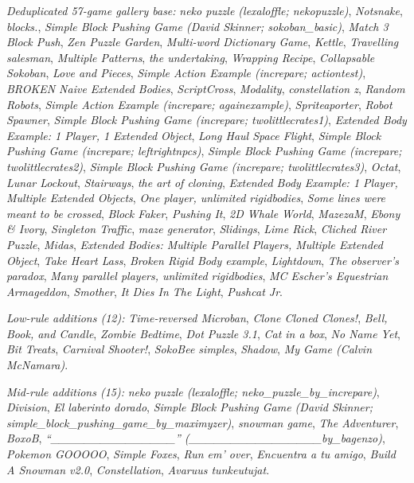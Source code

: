 \textit{Deduplicated 57-game gallery base:}
{\small
\textit{neko puzzle (lexaloffle; nekopuzzle)}, \textit{Notsnake},
\textit{blocks.}, \textit{Simple Block Pushing Game (David Skinner;
sokoban\_basic)}, \textit{Match 3 Block Push}, \textit{Zen Puzzle
Garden}, \textit{Multi-word Dictionary Game}, \textit{Kettle},
\textit{Travelling salesman}, \textit{Multiple Patterns}, \textit{the
undertaking}, \textit{Wrapping Recipe}, \textit{Collapsable Sokoban},
\textit{Love and Pieces}, \textit{Simple Action Example (increpare;
actiontest)}, \textit{BROKEN Naive Extended Bodies},
\textit{ScriptCross}, \textit{Modality}, \textit{constellation z},
\textit{Random Robots}, \textit{Simple Action Example (increpare;
againexample)}, \textit{Spriteaporter}, \textit{Robot Spawner},
\textit{Simple Block Pushing Game (increpare; twolittlecrates1)},
\textit{Extended Body Example: 1 Player, 1 Extended Object},
\textit{Long Haul Space Flight}, \textit{Simple Block Pushing Game
(increpare; leftrightnpcs)}, \textit{Simple Block Pushing Game
(increpare; twolittlecrates2)}, \textit{Simple Block Pushing Game
(increpare; twolittlecrates3)}, \textit{Octat}, \textit{Lunar
Lockout}, \textit{Stairways}, \textit{the art of cloning},
\textit{Extended Body Example: 1 Player, Multiple Extended Objects},
\textit{One player, unlimited rigidbodies}, \textit{Some lines were
meant to be crossed}, \textit{Block Faker}, \textit{Pushing It},
\textit{2D Whale World}, \textit{MazezaM}, \textit{Ebony \& Ivory},
\textit{Singleton Traffic}, \textit{maze generator},
\textit{Slidings}, \textit{Lime Rick}, \textit{Cliched River Puzzle},
\textit{Midas}, \textit{Extended Bodies: Multiple Parallel Players,
Multiple Extended Object}, \textit{Take Heart Lass}, \textit{Broken
Rigid Body example}, \textit{Lightdown}, \textit{The observer's
paradox}, \textit{Many parallel players, unlimited rigidbodies},
\textit{MC Escher's Equestrian Armageddon}, \textit{Smother},
\textit{It Dies In The Light}, \textit{Pushcat Jr}.
}

\textit{Low-rule additions (12):}
{\small
\textit{Time-reversed Microban}, \textit{Clone Cloned Clones!},
\textit{Bell, Book, and Candle}, \textit{Zombie Bedtime},
\textit{Dot Puzzle 3.1}, \textit{Cat in a box}, \textit{No Name Yet},
\textit{Bit Treats}, \textit{Carnival Shooter!}, \textit{SokoBee
simples}, \textit{Shadow}, \textit{My Game (Calvin McNamara)}.
}

\textit{Mid-rule additions (15):}
{\small
\textit{neko puzzle (lexaloffle; neko\_puzzle\_by\_increpare)},
\textit{Division}, \textit{El laberinto dorado}, \textit{Simple
Block Pushing Game (David Skinner;
simple\_block\_pushing\_game\_by\_maximyzer)}, \textit{snowman game},
\textit{The Adventurer}, \textit{BoxoB},
\textit{``\_\_\_\_\_\_\_\_\_\_\_\_\_\_\_'' (\_\_\_\_\_\_\_\_\_\_\_\_\_\_\_\_by\_bagenzo)},
\textit{Pokemon GOOOOO}, \textit{Simple Foxes}, \textit{Run em' over},
\textit{Encuentra a tu amigo}, \textit{Build A Snowman v2.0},
\textit{Constellation}, \textit{Avaruus tunkeutujat}.
}

